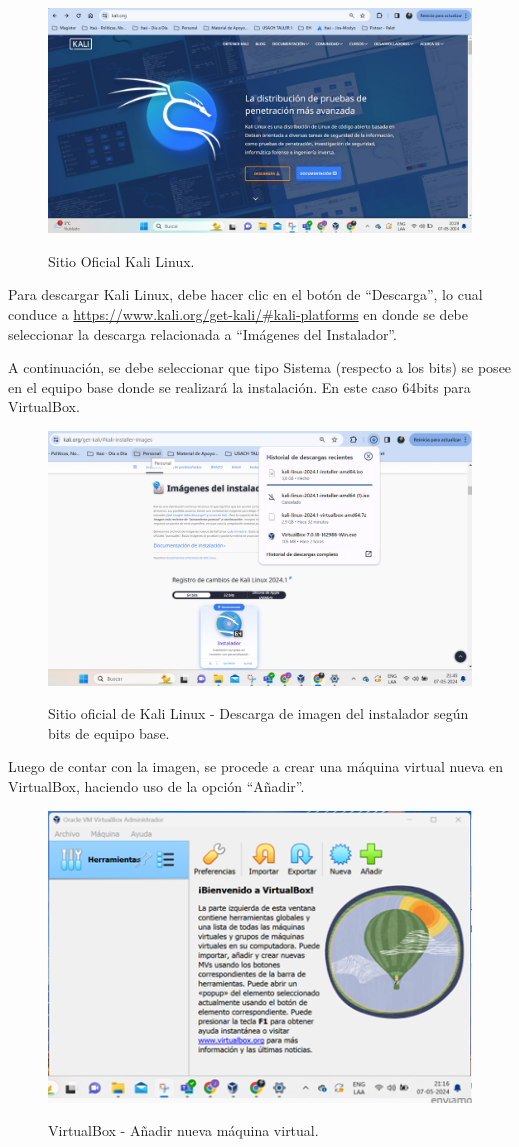 \documentclass[stu, 11pt, letterpaper, donotrepeattitle, floatsintext, natbib]{apa7}
\begin{document}
\begin{figure}[H]
    \centering
    \caption{Sitio Oficial Kali Linux.}
    \includegraphics[width=0.5\linewidth]{imagenCap2/10.png} %
    \label{fig:OverallEffect}
\end{figure}

Para descargar Kali Linux, debe hacer clic en el botón de “Descarga”, lo cual conduce a \url{https://www.kali.org/get-kali/#kali-platforms} en donde se debe seleccionar la descarga relacionada a “Imágenes del Instalador”.

A continuación, se debe seleccionar que tipo Sistema (respecto a los bits) se posee en el equipo base donde se realizará la instalación. En este caso 64bits para VirtualBox.

\begin{figure}[H]
    \centering
    \caption{Sitio oficial de Kali Linux - Descarga de imagen del instalador según bits de equipo base.}
    \includegraphics[width=0.5\linewidth]{imagenCap2/11.png} %
    \label{fig:OverallEffect}
\end{figure}

Luego de contar con la imagen, se procede a crear una máquina virtual nueva en VirtualBox, haciendo uso de la opción “Añadir”.

\begin{figure}[H]
    \centering
    \caption{VirtualBox - Añadir nueva máquina virtual.}
    \includegraphics[width=0.5\linewidth]{imagenCap2/12.png} %
    \label{fig:OverallEffect}
\end{figure}
\end{document}
